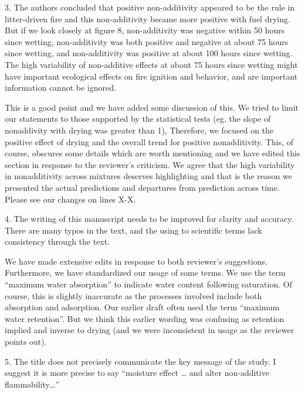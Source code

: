 \documentclass[letterpaper, 12pt]{letter}
\begin{document}
\begin{letter}{}
\begin{quoting}
  3. The authors concluded that positive non-additivity appeared to be the rule
  in litter-driven fire and this non-additivity became more positive with fuel
  drying. But if we look closely at figure 8, non-additivity was negative
  within 50 hours since wetting, non-additivity was both positive and negative
  at about 75 hours since wetting, and non-additivity was positive at about 100
  hours since wetting. The high variability of non-additive effects at about 75
  hours since wetting might have important ecological effects on fire ignition
  and behavior, and are important information cannot be ignored.
\end{quoting}

This is a good point and we have added some discussion of this. We tried to
limit our statements to those supported by the statistical tests (eg, the slope of
nonaddivity with drying was greater than 1), Therefore, we focused on the
positive effect of drying and the overall trend for positive nonadditivity.
This, of course, obscures some details which are worth mentioning and we have
edited this section in response to the reviewer's criticism. We agree that the
high variability in nonadditivity across mixtures deserves highlighting and
that is the reason we presented the actual predictions and departures from
prediction across time. Please see our changes on lines X-X.


\begin{quoting}
  4. The writing of this manuscript needs to be improved for clarity and
  accuracy. There are many typos in the text, and the using to scientific terms
  lack consistency through the text.
\end{quoting}

We have made extensive edits in response to both reviewer's suggestions.
Furthermore, we have standardized our usage of some terms. We use the term
``maximum water absorption'' to indicate water content following saturation. Of
course, this is slightly inaccurate as the processes involved include both
absorption and adsorption. Our earlier draft often used the term ``maximum
water retention''. But we think this earlier wording was confusing as retention
implied and inverse to drying (and we were inconsistent in usage as the
reviewer points out).

\begin{quoting}
  5. The title does not precisely communicate the key message of the study. I
  suggest it is more precise to say “moisture effect … and alter non-additive
  flammability…”
\end{quoting}


\end{letter}
\end{document}
